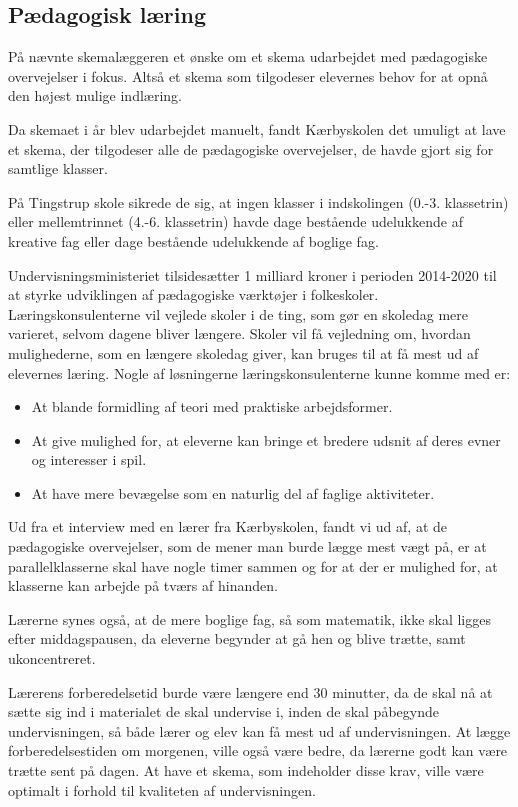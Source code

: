 \subsection{Pædagogisk læring}
\label{paedagogisk_laering}
På \school nævnte skemalæggeren et ønske om et skema udarbejdet med pædagogiske overvejelser i fokus. Altså et skema som tilgodeser elevernes behov for at opnå den højest mulige indlæring.

Da skemaet i år blev udarbejdet manuelt, fandt Kærbyskolen det umuligt at lave et skema, der tilgodeser alle de pædagogiske overvejelser, de havde gjort sig for samtlige klasser\cite{interview_Kaerby}.

På Tingstrup skole sikrede de sig, at ingen klasser i indskolingen (0.-3. klassetrin) eller mellemtrinnet (4.-6. klassetrin) havde dage bestående udelukkende af kreative fag eller dage bestående udelukkende af boglige fag. 

Undervisningsministeriet tilsidesætter 1 milliard kroner i perioden 2014-2020 til at styrke udviklingen af pædagogiske værktøjer i folkeskoler. Læringskonsulenterne vil vejlede skoler i de ting, som gør en skoledag mere varieret, selvom dagene bliver længere. Skoler vil få vejledning om, hvordan mulighederne, som en længere skoledag giver, kan bruges til at få mest ud af elevernes læring. Nogle af løsningerne læringskonsulenterne kunne komme med er:
\begin{itemize}
	\item At blande formidling af teori med praktiske arbejdsformer.
	\item At give mulighed for, at eleverne kan bringe et bredere udsnit af deres evner og interesser i spil.
	\item At have mere bevægelse som en naturlig del af faglige aktiviteter\cite{Paedagogisklaering}.
\end{itemize}
Ud fra et interview med en lærer fra Kærbyskolen, fandt vi ud af, at de pædagogiske overvejelser, som de mener man burde lægge mest vægt på, er at parallelklasserne skal have nogle timer sammen og for at der er mulighed for, at klasserne kan arbejde på tværs af hinanden.

Lærerne synes også, at de mere boglige fag, så som matematik, ikke skal ligges efter middagspausen, da eleverne begynder at gå hen og blive trætte, samt ukoncentreret. 

Lærerens forberedelsetid burde være længere end 30 minutter, da de skal nå at sætte sig ind i materialet de skal undervise i, inden de skal påbegynde undervisningen, så både lærer og elev kan få mest ud af undervisningen. At lægge forberedelsestiden om morgenen, ville også være bedre, da lærerne godt kan være trætte sent på dagen. At have et skema, som indeholder disse krav, ville være optimalt i forhold til kvaliteten af undervisningen\cite{interview_Laerer}.
